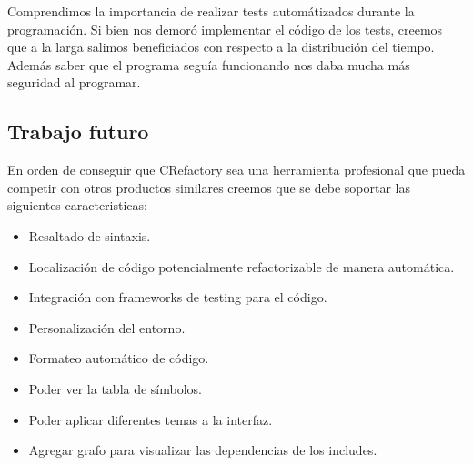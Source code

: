 \documentclass[a4paper,oneside,10pt]{article}
\begin{document}
Comprendimos la importancia de realizar tests automátizados durante la programación. Si bien nos demoró implementar el código de los tests, creemos que a la larga salimos beneficiados con respecto a la distribución del tiempo. Además saber que el programa seguía funcionando nos daba mucha más seguridad al programar.

\subsection{Trabajo futuro}
En orden de conseguir que CRefactory sea una herramienta profesional que pueda competir con otros productos similares creemos que se debe soportar las siguientes caracteristicas:

\begin{itemize}
	\item Resaltado de sintaxis.
	\item Localizaci\'on de c\'odigo potencialmente refactorizable de manera autom\'atica.
	\item Integraci\'on con frameworks de testing para el c\'odigo.
	\item Personalizaci\'on del entorno.
	\item Formateo autom\'atico de c\'odigo.
  \item Poder ver la tabla de símbolos.
  \item Poder aplicar diferentes temas a la interfaz.
  \item Agregar grafo para visualizar las dependencias de los includes.
\end{itemize}
\end{document}
